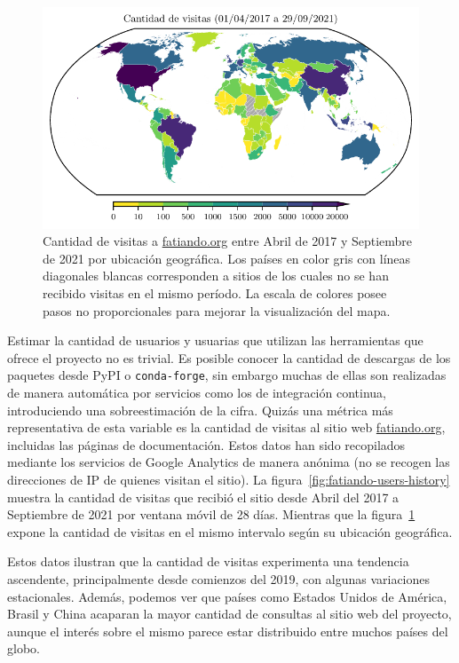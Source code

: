 \begin{figure}[t]
    \centering
    \includegraphics[width=\linewidth]{figs/fatiando/users_map.pdf}
    \caption{
        Cantidad de visitas a \href{https://fatiando.org}{fatiando.org} entre
        Abril de 2017 y Septiembre de 2021 por ubicación geográfica.
        Los países en color gris con líneas diagonales blancas corresponden
        a sitios de los cuales no se han recibido visitas en el mismo período.
        La escala de colores posee pasos no proporcionales para mejorar la
        visualización del mapa.
    }
    \label{fig:fatiando-users-map}
\end{figure}

Estimar la cantidad de usuarios y usuarias que utilizan las herramientas que
ofrece el proyecto no es trivial.
Es posible conocer la cantidad de descargas de los paquetes desde PyPI
o \texttt{conda-forge}, sin embargo muchas de ellas son realizadas de manera
automática por servicios como los de integración continua, introduciendo una
sobreestimación de la cifra.
Quizás una métrica más representativa de esta variable es la cantidad de
visitas al sitio web \href{https://fatiando.org}{fatiando.org}, incluidas las
páginas de documentación.
Estos datos han sido recopilados mediante los servicios de Google Analytics de
manera anónima (no se recogen las direcciones de IP de quienes visitan el
sitio).
La figura~\ref{fig:fatiando-users-history} muestra la cantidad de visitas que
recibió el sitio desde Abril del 2017 a Septiembre de 2021 por ventana móvil de
28 días.
Mientras que la figura~\ref{fig:fatiando-users-map} expone la cantidad de
visitas en el mismo intervalo según su ubicación geográfica.

Estos datos ilustran que la cantidad de visitas experimenta una tendencia
ascendente, principalmente desde comienzos del 2019, con algunas variaciones
estacionales.
Además, podemos ver que países como Estados Unidos de América, Brasil y China
acaparan la mayor cantidad de consultas al sitio web del proyecto,
aunque el interés sobre el mismo parece estar distribuido entre muchos
países del globo.


